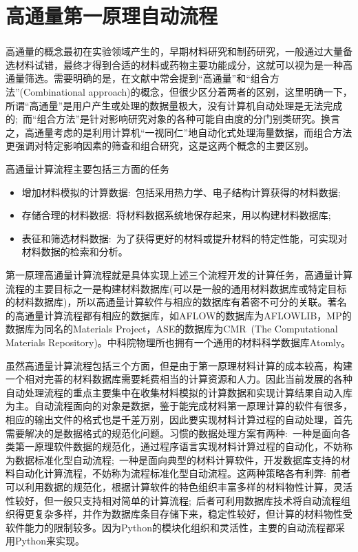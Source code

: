 \section{高通量第一原理自动流程}
\frame
{
	\frametitle{}
高通量的概念最初在实验领域产生的，早期材料研究和制药研究，一般通过大量备选材料试错，最终才得到合适的材料或药物主要功能成分，这就可以视为是一种高通量筛选。需要明确的是，在文献中常会提到“高通量”和“组合方法”(\textrm{Combinational approach})的概念，但很少区分着两者的区别，这里明确一下，所谓“高通量”是用户产生或处理的数据量极大，没有计算机自动处理是无法完成的;~而“组合方法”是针对影响研究对象的各种可能自由度的分门别类研究。换言之，高通量考虑的是利用计算机“一视同仁”地自动化式处理海量数据，而组合方法更强调对特定影响因素的筛查和组合研究，这是这两个概念的主要区别。

高通量计算流程主要包括三方面的任务
\begin{itemize}
	\item 增加材料模拟的计算数据:~包括采用热力学、电子结构计算获得的材料数据;
	\item 存储合理的材料数据:~将材料数据系统地保存起来，用以构建材料数据库;
	\item 表征和筛选材料数据:~为了获得更好的材料或提升材料的特定性能，可实现对材料数据的检索和分析。
\end{itemize}
第一原理高通量计算流程就是具体实现上述三个流程开发的计算任务，高通量计算流程的主要目标之一是构建材料数据库(可以是一般的通用材料数据库或特定目标的材料数据库)，所以高通量计算软件与相应的数据库有着密不可分的关联。著名的高通量计算流程都有相应的数据库，如\textrm{AFLOW}的数据库为\textrm{AFLOWLIB}\cite{CMS58-227_2012,AFLOWORG_URL}，\textrm{MP}的数据库为同名的\textrm{Materials Project}\cite{CMS50-2295_2011,MP_URL}，\textrm{ASE}的数据库为\textrm{CMR~(The Computational Materials Repository)}\cite{CSE14-51_2012,CMR_URL}。中科院物理所也拥有一个通用的材料科学数据库\textrm{Atomly}\cite{ATOMLY_URL}。

虽然高通量计算流程包括三个方面，但是由于第一原理材料计算的成本较高，构建一个相对完善的材料数据库需要耗费相当的计算资源和人力。因此当前发展的各种自动处理流程的重点主要集中在收集材料模拟的计算数据和实现计算结果自动入库为主。自动流程面向的对象是数据，鉴于能完成材料第一原理计算的软件有很多，相应的输出文件的格式也是千差万别，因此要实现材料计算过程的自动处理，首先需要解决的是数据格式的规范化问题。习惯的数据处理方案有两种:~一种是面向各类第一原理软件数据的规范化，通过程序语言实现材料计算过程的自动化，不妨称为数据标准化型自动流程;~一种是面向典型的材料计算软件，开发数据库支持的材料自动化计算流程，不妨称为流程标准化型自动流程。这两种策略各有利弊:~前者可以利用数据的规范化，根据计算软件的特色组织丰富多样的材料物性计算，灵活性较好，但一般只支持相对简单的计算流程;~后者可利用数据库技术将自动流程组织得更复杂多样，并作为数据库条目存储下来，稳定性较好，但计算的材料物性受软件能力的限制较多。因为\textrm{Python}\cite{Python_URL}的模块化组织和灵活性，主要的自动流程都采用\textrm{Python}来实现。
}


